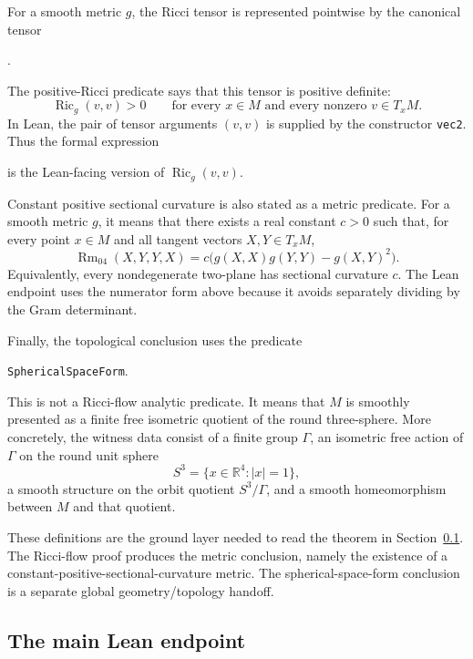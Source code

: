 \documentclass[11pt]{article}
\theoremstyle{plain}
\theoremstyle{definition}
\theoremstyle{remark}
\begin{document}
For a smooth metric \(g\), the Ricci tensor is represented pointwise by the
canonical tensor
\begin{center}
\texttt{}.
\end{center}
The positive-Ricci predicate says that this tensor is positive definite:
\[
  \operatorname{Ric}_g(v,v)>0
  \qquad
  \text{for every }x\in M\text{ and every nonzero }v\in T_xM .
\]
In Lean, the pair of tensor arguments \((v,v)\) is supplied by the constructor
\texttt{vec2}.  Thus the formal expression
\begin{center}
\texttt{}
\end{center}
is the Lean-facing version of \(\operatorname{Ric}_g(v,v)\).

Constant positive sectional curvature is also stated as a metric predicate.
For a smooth metric \(g\), it means that there exists a real constant \(c>0\)
such that, for every point \(x\in M\) and all tangent vectors
\(X,Y\in T_xM\),
\[
  \operatorname{Rm}_{04}(X,Y,Y,X)
  =
  c\bigl(
    g(X,X)g(Y,Y)-g(X,Y)^2
  \bigr).
\]
Equivalently, every nondegenerate two-plane has sectional curvature \(c\).
The Lean endpoint uses the numerator form above because it avoids separately
dividing by the Gram determinant.

Finally, the topological conclusion uses the predicate
\begin{center}
\texttt{SphericalSpaceForm}.
\end{center}
This is not a Ricci-flow analytic predicate.  It means that \(M\) is smoothly
presented as a finite free isometric quotient of the round three-sphere.  More
concretely, the witness data consist of a finite group \(\Gamma\), an isometric
free action of \(\Gamma\) on the round unit sphere
\[
  S^3=\{x\in \mathbb{R}^4:|x|=1\},
\]
a smooth structure on the orbit quotient \(S^3/\Gamma\), and a smooth
homeomorphism between \(M\) and that quotient.

These definitions are the ground layer needed to read the theorem in
Section~\ref{subsec:main-lean-endpoint}.  The Ricci-flow proof produces the metric
conclusion, namely the existence of a constant-positive-sectional-curvature
metric.  The spherical-space-form conclusion is a separate global
geometry/topology handoff.

\subsection{The main Lean endpoint}
\label{subsec:main-lean-endpoint}
\end{document}
